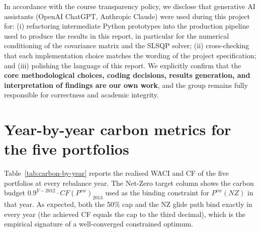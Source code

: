 \documentclass[11pt,a4paper]{article}
\begin{document}
In accordance with the course transparency policy, we disclose that
generative AI assistants (OpenAI ChatGPT, Anthropic Claude) were used
during this project for: (i) refactoring intermediate Python prototypes
into the production pipeline used to produce the results in this
report, in particular for the numerical conditioning of the covariance
matrix and the SLSQP solver; (ii) cross-checking that each
implementation choice matches the wording of the project
specification; and (iii) polishing the language of this report. We
explicitly confirm that the \textbf{core methodological choices,
coding decisions, results generation, and interpretation of findings
are our own work}, and the group remains fully responsible for
correctness and academic integrity.

\appendix
\section{Year-by-year carbon metrics for the five portfolios}\label{app:carbon}

Table~\ref{tab:carbon-by-year} reports the realised WACI and CF of the five
portfolios at every rebalance year. The Net-Zero target column shows the
carbon budget $0.9^{Y-2012}\cdot CF(P^{vw})_{2013}$ used as the binding
constraint for $P^{vw}(NZ)$ in that year. As expected, both the 50\% cap
and the NZ glide path bind exactly in every year (the achieved CF equals
the cap to the third decimal), which is the empirical signature of a
well-converged constrained optimum.
\end{document}
